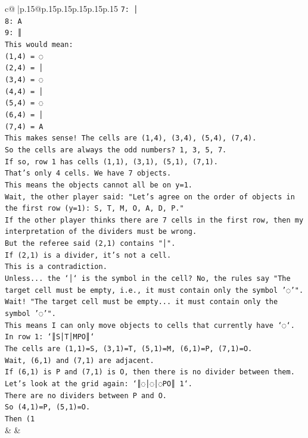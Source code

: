 \documentclass{article}
\begin{document}
{\begin{supertabular}{c@{$\;$}|p{.15\linewidth}@{}p{.15\linewidth}p{.15\linewidth}p{.15\linewidth}p{.15\linewidth}p{.15\linewidth}}
{{{\texttt{7: │} \\
\texttt{8: A} \\
\texttt{9: ║} \\
\texttt{This would mean:} \\
\texttt{(1,4) = ◌} \\
\texttt{(2,4) = │} \\
\texttt{(3,4) = ◌} \\
\texttt{(4,4) = │} \\
\texttt{(5,4) = ◌} \\
\texttt{(6,4) = │} \\
\texttt{(7,4) = A} \\
\texttt{This makes sense! The cells are (1,4), (3,4), (5,4), (7,4).} \\
\texttt{So the cells are always the odd numbers? 1, 3, 5, 7.} \\
\texttt{If so, row 1 has cells (1,1), (3,1), (5,1), (7,1).} \\
\texttt{That's only 4 cells. We have 7 objects.} \\
\texttt{This means the objects cannot all be on y=1.} \\
\texttt{Wait, the other player said: "Let's agree on the order of objects in the first row (y=1): S, T, M, O, A, D, P."} \\
\texttt{If the other player thinks there are 7 cells in the first row, then my interpretation of the dividers must be wrong.} \\
\texttt{But the referee said (2,1) contains "│".} \\
\texttt{If (2,1) is a divider, it's not a cell.} \\
\texttt{This is a contradiction.} \\
\texttt{Unless... the `│` is the symbol in the cell? No, the rules say "The target cell must be empty, i.e., it must contain only the symbol '◌'".} \\
\texttt{Wait! "The target cell must be empty... it must contain only the symbol '◌'".} \\
\texttt{This means I can only move objects to cells that currently have `◌`.} \\
\texttt{In row 1: `║S│T│MPO║`} \\
\texttt{The cells are (1,1)=S, (3,1)=T, (5,1)=M, (6,1)=P, (7,1)=O.} \\
\texttt{Wait, (6,1) and (7,1) are adjacent.} \\
\texttt{If (6,1) is P and (7,1) is O, then there is no divider between them.} \\
\texttt{Let's look at the grid again: `║◌│◌│◌PO║ 1`.} \\
\texttt{There are no dividers between P and O.} \\
\texttt{So (4,1)=P, (5,1)=O.} \\
\texttt{Then (1} \\
            }
        }
    }
    & & \\ \\


\end{supertabular}}
\end{document}
